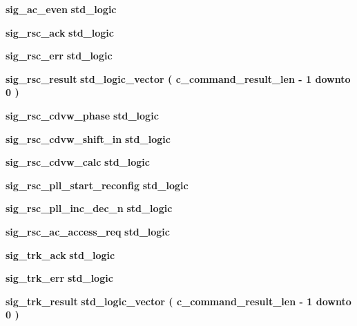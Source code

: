 \begin{DoxyCompactItemize}
\item 
{\bf sig\+\_\+ac\+\_\+even} {\bfseries \textcolor{comment}{std\+\_\+logic}\textcolor{vhdlchar}{ }} 
\item 
{\bf sig\+\_\+rsc\+\_\+ack} {\bfseries \textcolor{comment}{std\+\_\+logic}\textcolor{vhdlchar}{ }} 
\item 
{\bf sig\+\_\+rsc\+\_\+err} {\bfseries \textcolor{comment}{std\+\_\+logic}\textcolor{vhdlchar}{ }} 
\item 
{\bf sig\+\_\+rsc\+\_\+result} {\bfseries \textcolor{comment}{std\+\_\+logic\+\_\+vector}\textcolor{vhdlchar}{ }\textcolor{vhdlchar}{(}\textcolor{vhdlchar}{ }\textcolor{vhdlchar}{ }\textcolor{vhdlchar}{ }\textcolor{vhdlchar}{ }{\bfseries {\bf c\+\_\+command\+\_\+result\+\_\+len}} \textcolor{vhdlchar}{-\/}\textcolor{vhdlchar}{ } \textcolor{vhdldigit}{1} \textcolor{vhdlchar}{ }\textcolor{keywordflow}{downto}\textcolor{vhdlchar}{ }\textcolor{vhdlchar}{ } \textcolor{vhdldigit}{0} \textcolor{vhdlchar}{ }\textcolor{vhdlchar}{)}\textcolor{vhdlchar}{ }} 
\item 
{\bf sig\+\_\+rsc\+\_\+cdvw\+\_\+phase} {\bfseries \textcolor{comment}{std\+\_\+logic}\textcolor{vhdlchar}{ }} 
\item 
{\bf sig\+\_\+rsc\+\_\+cdvw\+\_\+shift\+\_\+in} {\bfseries \textcolor{comment}{std\+\_\+logic}\textcolor{vhdlchar}{ }} 
\item 
{\bf sig\+\_\+rsc\+\_\+cdvw\+\_\+calc} {\bfseries \textcolor{comment}{std\+\_\+logic}\textcolor{vhdlchar}{ }} 
\item 
{\bf sig\+\_\+rsc\+\_\+pll\+\_\+start\+\_\+reconfig} {\bfseries \textcolor{comment}{std\+\_\+logic}\textcolor{vhdlchar}{ }} 
\item 
{\bf sig\+\_\+rsc\+\_\+pll\+\_\+inc\+\_\+dec\+\_\+n} {\bfseries \textcolor{comment}{std\+\_\+logic}\textcolor{vhdlchar}{ }} 
\item 
{\bf sig\+\_\+rsc\+\_\+ac\+\_\+access\+\_\+req} {\bfseries \textcolor{comment}{std\+\_\+logic}\textcolor{vhdlchar}{ }} 
\item 
{\bf sig\+\_\+trk\+\_\+ack} {\bfseries \textcolor{comment}{std\+\_\+logic}\textcolor{vhdlchar}{ }} 
\item 
{\bf sig\+\_\+trk\+\_\+err} {\bfseries \textcolor{comment}{std\+\_\+logic}\textcolor{vhdlchar}{ }} 
\item 
{\bf sig\+\_\+trk\+\_\+result} {\bfseries \textcolor{comment}{std\+\_\+logic\+\_\+vector}\textcolor{vhdlchar}{ }\textcolor{vhdlchar}{(}\textcolor{vhdlchar}{ }\textcolor{vhdlchar}{ }\textcolor{vhdlchar}{ }\textcolor{vhdlchar}{ }{\bfseries {\bf c\+\_\+command\+\_\+result\+\_\+len}} \textcolor{vhdlchar}{-\/}\textcolor{vhdlchar}{ } \textcolor{vhdldigit}{1} \textcolor{vhdlchar}{ }\textcolor{keywordflow}{downto}\textcolor{vhdlchar}{ }\textcolor{vhdlchar}{ } \textcolor{vhdldigit}{0} \textcolor{vhdlchar}{ }\textcolor{vhdlchar}{)}\textcolor{vhdlchar}{ }} 

\end{DoxyCompactItemize}
